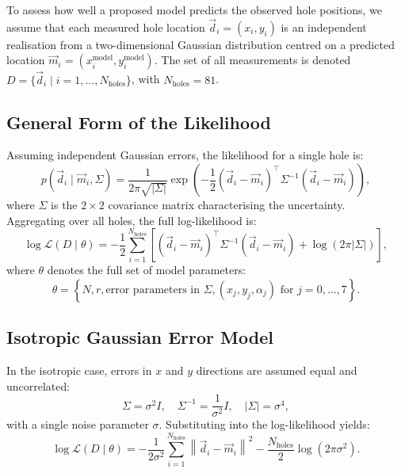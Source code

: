 \documentclass[a4paper,12pt]{article}
\begin{document}
To assess how well a proposed model predicts the observed hole positions, we assume that each measured hole location $\vec{d}_i = (x_i, y_i)$ is an independent realisation from a two-dimensional Gaussian distribution centred on a predicted location $\vec{m}_i = (x_i^{\text{model}}, y_i^{\text{model}})$. The set of all measurements is denoted $D = \{ \vec{d}_i \mid i = 1, \dots, N_{\text{holes}} \}$, with $N_{\text{holes}} = 81$.

\subsection{General Form of the Likelihood}

Assuming independent Gaussian errors, the likelihood for a single hole is:
\begin{equation}
    p(\vec{d}_i \mid \vec{m}_i, \Sigma) = \frac{1}{2\pi \sqrt{|\Sigma|}} \exp\left( -\frac{1}{2} (\vec{d}_i - \vec{m}_i)^\top \Sigma^{-1} (\vec{d}_i - \vec{m}_i) \right),
\end{equation}
where $\Sigma$ is the $2 \times 2$ covariance matrix characterising the uncertainty. Aggregating over all holes, the full log-likelihood is:
\begin{equation}
    \log \mathcal{L}(D \mid \theta) = -\frac{1}{2} \sum_{i=1}^{N_{\text{holes}}} \left[ (\vec{d}_i - \vec{m}_i)^\top \Sigma^{-1} (\vec{d}_i - \vec{m}_i) + \log(2\pi |\Sigma|) \right],
\end{equation}
where $\theta$ denotes the full set of model parameters:
\[
\theta = \left\{ N, r, \text{error parameters in } \Sigma, (x_j, y_j, \alpha_j) \text{ for } j = 0,\dots,7 \right\}.
\]

\subsection{Isotropic Gaussian Error Model}

In the isotropic case, errors in $x$ and $y$ directions are assumed equal and uncorrelated:
\begin{equation}
    \Sigma = \sigma^2 I, \quad \Sigma^{-1} = \frac{1}{\sigma^2} I, \quad |\Sigma| = \sigma^4,
\end{equation}
with a single noise parameter $\sigma$. Substituting into the log-likelihood yields:
\begin{equation}
    \log \mathcal{L}(D \mid \theta) = -\frac{1}{2\sigma^2} \sum_{i=1}^{N_{\text{holes}}} \left\| \vec{d}_i - \vec{m}_i \right\|^2 - \frac{N_{\text{holes}}}{2} \log(2\pi \sigma^2).
\end{equation}
\end{document}
